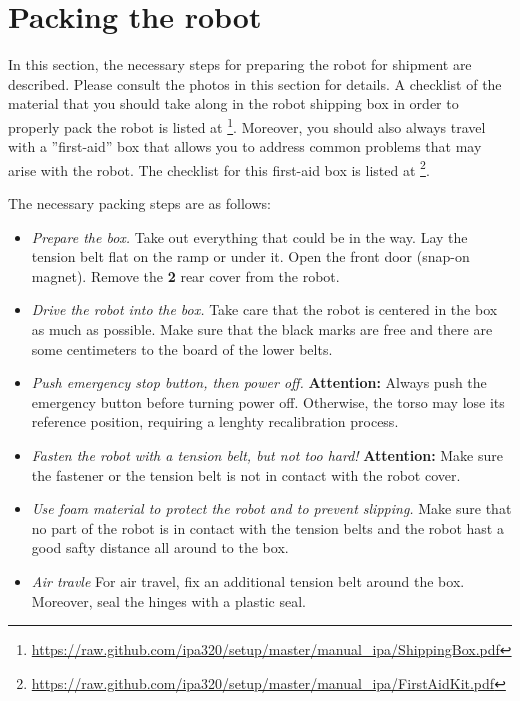 \chapter{Packing the robot}
\label{chap:packing}   

In this section, the necessary steps for preparing the robot for shipment are described. Please consult the photos in this section for details.
A checklist of the material that you should take along in the robot shipping box in order to properly pack the robot is listed at \footnote{\url{https://raw.github.com/ipa320/setup/master/manual_ipa/ShippingBox.pdf}}.
Moreover, you should also always travel with a ''first-aid'' box that allows you to address common problems that may arise with the robot. The checklist for this first-aid box is listed at \footnote{\url{https://raw.github.com/ipa320/setup/master/manual_ipa/FirstAidKit.pdf}}.

The necessary packing steps are as follows:
\begin{itemize}
\item {\em Prepare the box.} Take out everything that could be in the way. Lay the tension belt flat on the ramp or under it. Open the front door (snap-on magnet). Remove the {\bf 2} rear cover from the robot.
\item {\em Drive the robot into the box.} Take care that the robot is centered in the box as much as possible. Make sure that the black marks are free and there are some centimeters to the board of the lower belts.
\item {\em Push emergency stop button, then power off.} {\bf Attention:} Always push the emergency button before turning power off. Otherwise, the torso may lose its reference position, requiring a lenghty recalibration process.
\item {\em Fasten the robot with a tension belt, but not too hard!} {\bf Attention:} Make sure the fastener or the tension belt is not in contact with the robot cover. 
\item {\em Use foam material to protect the robot and to prevent slipping.} Make sure that no part of the robot is in contact with the tension belts and the robot hast a good safty distance all around to the box. 
\item {\em Air travle} For air travel, fix an additional tension belt around the box. Moreover, seal the hinges with a plastic seal.
\end{itemize}

\newpage

